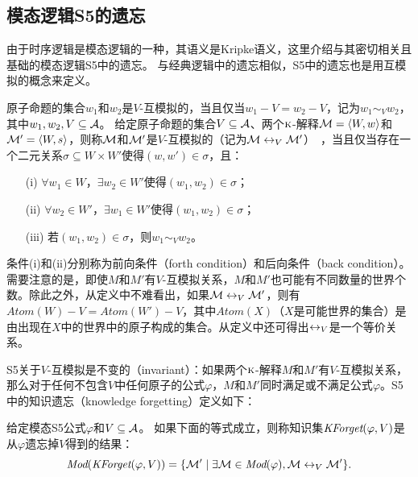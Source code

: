 \subsection{模态逻辑S5的遗忘}\label{chapter:sub:s5forgetting}

由于时序逻辑是模态逻辑的一种，其语义是Kripke语义，这里介绍与其密切相关且基础的模态逻辑S5中的遗忘。
与经典逻辑中的遗忘相似，S5中的遗忘也是用互模拟的概念来定义。

原子命题的集合$w_1$和$w_2$是$V$-互模拟的，当且仅当$w_1 -V = w_2 -V$，记为$w_1 \sim_V w_2$，其中$w_1, w_2, V \subseteq {\cal A}$。
给定原子命题的集合$V\subseteq {\cal A}$、两个$\textsc{k}$-解释${\cal M}={\langle{W,w}\rangle}$和${\cal M}'={\langle{W,s}\rangle}$，则称${\cal M}$和${\cal M}'$是$V$-互模拟的（记为${\cal M} \leftrightarrow_{V} {\cal M}'$）~\cite{Zhang2008Properties}，当且仅当存在一个二元关系$\sigma \subseteq W \times W'$使得$(w,w') \in \sigma$，且：
\begin{itemize}
	\item[(i)] $\forall w_1 \in W$，$\exists w_2\in W'$使得$(w_1, w_2) \in \sigma$；
	\item[(ii)] $\forall w_2 \in W'$，$\exists w_1\in W'$使得$(w_1, w_2) \in \sigma$；
	\item[(iii)] 若$(w_1, w_2) \in \sigma$，则$w_1\sim_V w_2$。
\end{itemize}

条件(i)和(ii)分别称为前向条件（forth condition）和后向条件（back condition）。需要注意的是，即使$M$和$M'$有$V$-互模拟关系，$M$和$M'$也可能有不同数量的世界个数。除此之外，从定义中不难看出，如果${\cal M} \leftrightarrow_{V} {\cal M}'$，则有$Atom(W)-V=Atom(W' )-V$，其中$Atom(X)$（$X$是可能世界的集合）是由出现在$X$中的世界中的原子构成的集合。从定义中还可得出$\leftrightarrow_V$是一个等价关系。

S5关于$V$-互模拟是不变的（invariant）：如果两个$\textsc{k}$-解释$M$和$M'$有$V$-互模拟关系，那么对于任何不包含$V$中任何原子的公式$\varphi$，$M$和$M'$同时满足或不满足公式$\varphi$。S5中的知识遗忘（knowledge forgetting）定义如下\cite{Zhang2008Properties}：

\begin{definition}\label{def:s5forgetting}
	给定模态S5公式$\varphi$和$V\subseteq {\cal A}$。
	如果下面的等式成立，则称知识集$\textit{KForget}(\varphi,V)$是从$\varphi$遗忘掉$V$得到的结果：
	$$\textit{Mod}(\textit{KForget}(\varphi, V)) = \{{\cal M}' \mid \exists {\cal M} \in \textit{Mod}(\varphi), {\cal M} \leftrightarrow_V {\cal M}'\}.$$
\end{definition}


